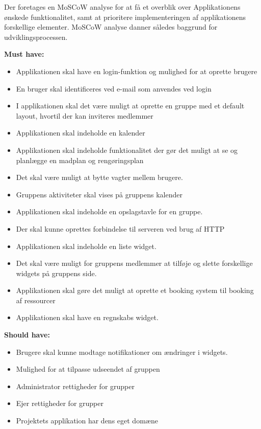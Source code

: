 Der foretages en MoSCoW analyse for at få et overblik over Applikationens ønskede funktionalitet, samt at prioritere implementeringen af applikationens forskellige elementer. MoSCoW analyse danner således baggrund for udviklingsprocessen.
\newline\newline

\noindent \textbf{Must have:}

\begin{itemize}
    \item Applikationen skal have en login-funktion og mulighed for at oprette brugere
    \item En bruger skal identificeres ved e-mail som anvendes ved login
    \item I applikationen skal det være muligt at oprette en gruppe med et default layout, hvortil der kan inviteres medlemmer
    \item Applikationen skal indeholde en kalender
    \item Applikationen skal indeholde funktionalitet der gør det muligt at se og planlægge en madplan og rengøringsplan
    \item Det skal være muligt at bytte vagter mellem brugere. 
    \item Gruppens aktiviteter skal vises på gruppens kalender
    \item Applikationen skal indeholde en opslagstavle for en gruppe.
    \item Der skal kunne oprettes forbindelse til serveren ved brug af HTTP
    \item Applikationen skal indeholde en liste widget.
    \item Det skal være muligt for gruppens medlemmer at tilføje og slette forskellige widgets på gruppens side.
    \item Applikationen skal gøre det muligt at oprette et booking system til booking af ressourcer
    \item Applikationen skal have en regnskabs widget.
\end{itemize}

\noindent \textbf{Should have:}

\begin{itemize}
    \item Brugere skal kunne modtage notifikationer om ændringer i widgets.
    \item Mulighed for at tilpasse udseendet af gruppen
    \item Administrator rettigheder for grupper
    \item Ejer rettigheder for grupper
    \item Projektets applikation har dens eget domæne
\end{itemize}

